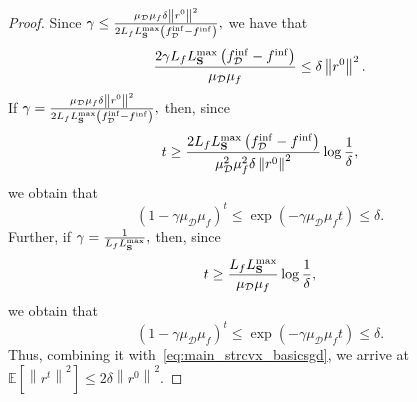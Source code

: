 \documentclass{article}
\newcommand{\bb}{\mathbb}
\newcommand{\Exp}[1]{{\bb E}\left[#1\right]}
\theoremstyle{plain}
\newcommand{\tf}{f_{\mathcal{D}}}
\newcommand{\mS}{{\bf S}}
\theoremstyle{plain}
\theoremstyle{definition}
\theoremstyle{remark}
\begin{document}
\begin{proof}
	Since $\gamma\leq \frac{\mu_{\mathcal{D}}\mu_f\delta\left\|r^0\right\|^2}{2L_fL_{\mS}^{\max}\left(\tf^{\inf} - f^{\inf}\right)},$
	we have that
	\begin{equation*}
		\frac{2\gamma L_fL_{\mS}^{\max}\left(\tf^{\inf} - f^{\inf}\right)}{\mu_{\mathcal{D}}\mu_f} \leq\delta\left\|r^0\right\|^2.
	\end{equation*}
	If $\gamma= \frac{\mu_{\mathcal{D}}\mu_f\delta\left\|r^0\right\|^2}{2L_fL_{\mS}^{\max}\left(\tf^{\inf} - f^{\inf}\right)},$ then, since
	\begin{equation*}
		t\geq \frac{2L_fL_{\mS}^{\max}\left(\tf^{\inf} - f^{\inf}\right)}{\mu_{\mathcal{D}}^2\mu_f^2\delta\left\|r^0\right\|^2}\log\frac{1}{\delta},
	\end{equation*}
	we obtain that
	\begin{equation*}
		\left(1-\gamma\mu_{\mathcal{D}}\mu_f\right)^t\leq\exp\left(-\gamma\mu_{\mathcal{D}}\mu_ft\right)\leq\delta.
	\end{equation*}
	Further, if $\gamma=\frac{1}{L_fL_{\mS}^{\max}},$ then, since
	\begin{equation*}
		t\geq \frac{L_fL_{\mS}^{\max}}{\mu_{\mathcal{D}}\mu_f}\log\frac{1}{\delta},
	\end{equation*}
	we obtain that
	\begin{equation*}
		\left(1-\gamma\mu_{\mathcal{D}}\mu_f\right)^t\leq\exp\left(-\gamma\mu_{\mathcal{D}}\mu_ft\right)\leq\delta.
	\end{equation*}
	Thus, combining it with~\eqref{eq:main_strcvx_basicsgd}, we arrive at $\Exp{\left\|r^{t}\right\|^2} \leq 2\delta\left\|r^0\right\|^2.$
\end{proof}
\end{document}
